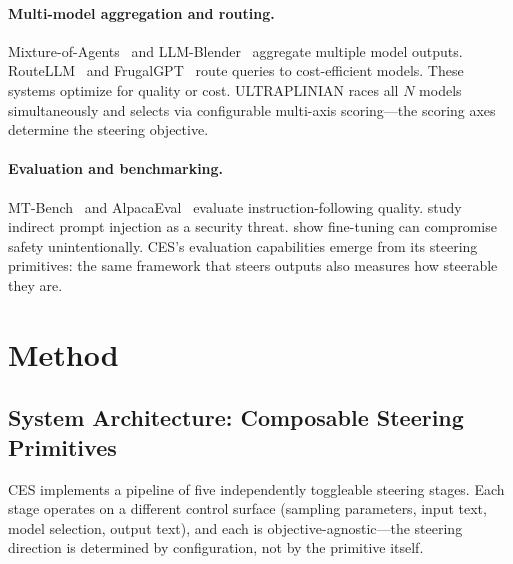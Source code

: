 \documentclass[11pt]{article}
\begin{document}
\paragraph{Multi-model aggregation and routing.}
Mixture-of-Agents~\cite{wang2024mixture} and LLM-Blender~\cite{jiang2023llmblender} aggregate multiple model outputs. RouteLLM~\cite{ong2024routellm} and FrugalGPT~\cite{chen2023frugalgpt} route queries to cost-efficient models. These systems optimize for quality or cost. ULTRAPLINIAN races all $N$ models simultaneously and selects via configurable multi-axis scoring---the scoring axes determine the steering objective.

\paragraph{Evaluation and benchmarking.}
MT-Bench~\cite{zheng2024judging} and AlpacaEval~\cite{li2023alpacaeval} evaluate instruction-following quality. \citet{greshake2023not} study indirect prompt injection as a security threat. \citet{qi2024finetuning} show fine-tuning can compromise safety unintentionally. CES's evaluation capabilities emerge from its steering primitives: the same framework that steers outputs also measures how steerable they are.

\section{Method}
\label{sec:method}

\subsection{System Architecture: Composable Steering Primitives}

CES implements a pipeline of five independently toggleable steering stages. Each stage operates on a different control surface (sampling parameters, input text, model selection, output text), and each is objective-agnostic---the steering direction is determined by configuration, not by the primitive itself.
\end{document}
